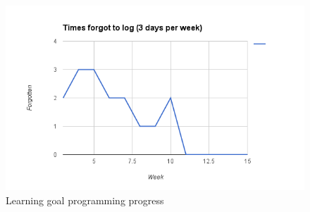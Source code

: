 \documentclass[12pt]{article}
\begin{document}
	\begin{figure}[ht]
		\centering
		\includegraphics[width=\textwidth, keepaspectratio=true]{personaldossiers/LearningGoalLoggingMartijn.png}
		\caption{Learning goal programming progress}\label{lglogging}
	\end{figure}
	
	
	
	
\end{document}
